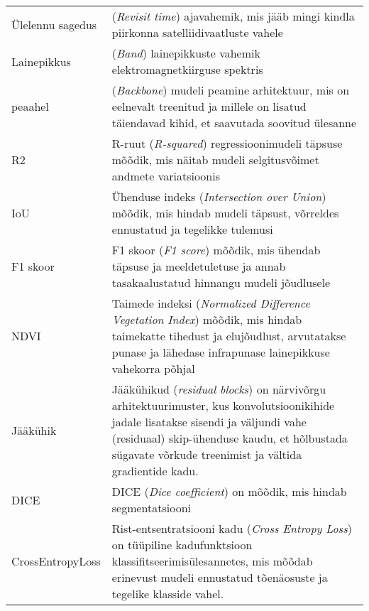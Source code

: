 \begin{longtable}{p{3cm}p{10cm}}  %
Ülelennu sagedus & (\textit{Revisit time}) ajavahemik, mis jääb mingi kindla
piirkonna satelliidivaatluste vahele\\
Lainepikkus & (\textit{Band}) lainepikkuste vahemik elektromagnetkiirguse spektris \\
peaahel & (\textit{Backbone}) mudeli peamine arhitektuur, mis on eelnevalt treenitud
ja millele on lisatud täiendavad kihid, et saavutada soovitud ülesanne\\
R2 & R-ruut (\textit{R-squared}) regressioonimudeli täpsuse mõõdik, mis näitab
mudeli selgitusvõimet andmete variatsioonis\\
IoU & Ühenduse indeks (\textit{Intersection over Union}) mõõdik, mis hindab
mudeli täpsust, võrreldes ennustatud ja tegelikke tulemusi\\
F1 skoor & F1 skoor (\textit{F1 score}) mõõdik, mis ühendab täpsuse ja
meeldetuletuse ja annab tasakaalustatud hinnangu mudeli jõudlusele\\
NDVI & Taimede indeksi (\textit{Normalized Difference Vegetation Index}) mõõdik, mis
hindab taimekatte tihedust ja elujõudlust, arvutatakse punase ja lähedase
infrapunase lainepikkuse vahekorra põhjal\\
Jääkühik & Jääkühikud (\textit{residual blocks}) on närvivõrgu arhitektuurimuster, kus konvolutsioonikihide jadale lisatakse sisendi ja väljundi vahe (residuaal) skip-ühenduse kaudu, et hõlbustada sügavate võrkude treenimist ja vältida gradientide kadu. \\
DICE & DICE (\textit{Dice coefficient}) on mõõdik, mis hindab segmentatsiooni \\
CrossEntropyLoss & Rist-entsentratsiooni kadu (\textit{Cross Entropy Loss}) on
tüüpiline kadufunktsioon klassifitseerimisülesannetes, mis mõõdab erinevust mudeli ennustatud tõenäosuste ja tegelike klasside vahel. \\
\end{longtable}
\addtocounter{table}{-1} %